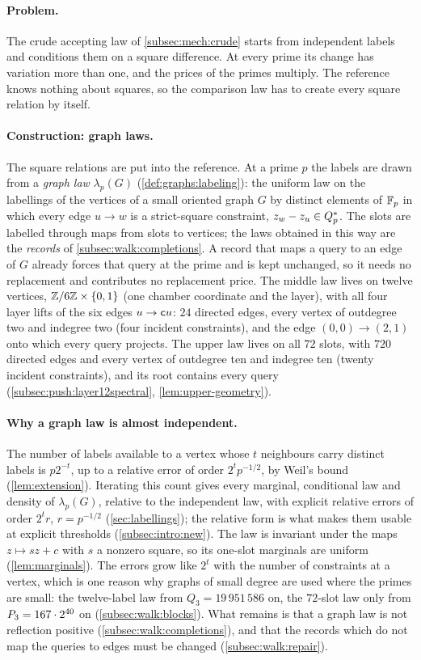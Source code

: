 \paragraph{Problem.}
The crude accepting law of \cref{subsec:mech:crude} starts from independent
labels and conditions them on a square difference. At every prime its change
has variation more than one, and the prices of the primes multiply. The
reference knows nothing about squares, so the comparison law has to create
every square relation by itself.

\paragraph{Construction: graph laws.}
The square relations are put into the reference. At a prime $p$ the labels
are drawn from a \emph{graph law} $\lambda_p(G)$ (\cref{def:graphs:labeling}):
the uniform law on the labellings of the vertices of a small oriented graph $G$
by distinct elements of $\mathbb F_p$ in which every edge $u\to w$ is a strict-square
constraint, $z_w-z_u\in Q_{p}^{*}$. The slots are labelled through maps from slots to
vertices; the laws obtained in this way are the \emph{records} of
\cref{subsec:walk:completions}. A record that maps a query to an edge of $G$
already forces that query at the prime and is kept unchanged, so
it needs no replacement and contributes no replacement price. The middle law lives on twelve
vertices, $\mathbb Z/6\mathbb Z\times\{0,1\}$ (one chamber coordinate and the layer), with all
four layer lifts of the six edges $u\to\mathsf c u$: $24$ directed edges, every vertex of
outdegree two and indegree two (four incident constraints), and the
edge $(0,0)\to(2,1)$ onto which every query projects. The
upper law lives on all $72$ slots, with $720$ directed edges and every vertex of
outdegree ten and indegree ten (twenty incident constraints), and
its root contains every query
(\cref{subsec:push:layer12spectral}, \cref{lem:upper-geometry}).

\paragraph{Why a graph law is almost independent.}
The number of labels available to a vertex whose $t$ neighbours carry distinct
labels is $p2^{-t}$, up to a relative error of order $2^tp^{-1/2}$, by Weil's
bound (\cref{lem:extension}). Iterating this count gives every marginal,
conditional law and density of $\lambda_p(G)$, relative to the independent
law, with explicit relative errors of order $2^tr$, $r=p^{-1/2}$
(\cref{sec:labellings}); the relative form is what makes them usable at
explicit thresholds (\cref{subsec:intro:new}). The law is invariant under the maps
$z\mapsto sz+c$ with $s$ a nonzero square, so its one-slot marginals are
uniform (\cref{lem:marginals}). The errors grow like $2^t$ with the number of
constraints at a vertex, which is one reason why graphs of small degree are
used where the primes are small: the twelve-label law from
$Q_3=19\,951\,586$ on, the $72$-slot law only from $P_3=167\cdot2^{40}$ on
(\cref{subsec:walk:blocks}). What remains is that a graph law is not
reflection positive (\cref{subsec:walk:completions}), and that the records
which do not map the queries to edges must be changed
(\cref{subsec:walk:repair}).

